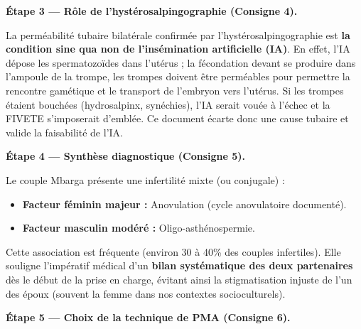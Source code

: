 \documentclass[11pt]{article}
\newcommand{\cle}[1]{{\popxbold\color{popdark}#1}}
\begin{document}
\begin{exoresolu}
\textbf{Étape 3 — Rôle de l'hystérosalpingographie (Consigne 4).}

La perméabilité tubaire bilatérale confirmée par l'hystérosalpingographie est \textbf{la condition sine qua non de l'insémination artificielle (IA)}. En effet, l'IA dépose les spermatozoïdes dans l'utérus ; la fécondation devant se produire dans l'ampoule de la trompe, les trompes doivent être perméables pour permettre la rencontre gamétique et le transport de l'embryon vers l'utérus. Si les trompes étaient bouchées (hydrosalpinx, synéchies), l'IA serait vouée à l'échec et la FIVETE s'imposerait d'emblée. Ce document écarte donc une cause tubaire et valide la faisabilité de l'IA.

\textbf{Étape 4 — Synthèse diagnostique (Consigne 5).}

Le couple Mbarga présente une infertilité \cle{mixte} (ou conjugale) :
\begin{itemize}
\item \textbf{Facteur féminin majeur :} Anovulation (cycle anovulatoire documenté).
\item \textbf{Facteur masculin modéré :} Oligo-asthénospermie.
\end{itemize}
Cette association est fréquente (environ 30 à 40\% des couples infertiles). Elle souligne l'impératif médical d'un \textbf{bilan systématique des deux partenaires} dès le début de la prise en charge, évitant ainsi la stigmatisation injuste de l'un des époux (souvent la femme dans nos contextes socioculturels).

\textbf{Étape 5 — Choix de la technique de PMA (Consigne 6).}


\end{exoresolu}
\end{document}
